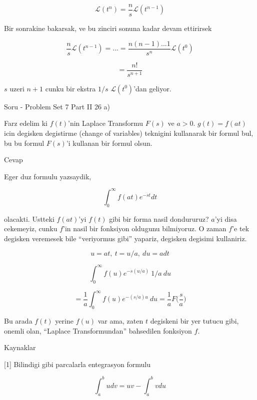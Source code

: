 \documentclass[12pt,fleqn]{article}\usepackage{../common}
\begin{document}
\[ \mathcal{L} (t^n) = \frac{n}{s} \mathcal{L} (t^{n-1}) 
 \]

Bir sonrakine bakarsak, ve bu zinciri sonuna kadar devam ettirirsek

\[ \frac{n}{s} \mathcal{L} (t^{n-1}) = ... = 
\frac{n(n-1)...1 }{s^n}\mathcal{L}(t^0)
 \]

\[ = \frac{n!}{s^{n+1}} \]

$s$ uzeri $n+1$ cunku bir ekstra $1/s$ $\mathcal{L} (t^0)$'dan geliyor. 

Soru - Problem Set 7 Part II 26 a) 

Farz edelim ki $f(t)$'nin Laplace Transformu $F(s)$ ve $a > 0$. $g(t) =
f(at)$ icin
degisken degistirme (change of variables) teknigini kullanarak bir formul
bul, bu bu formul $F(s)$'i kullanan bir formul olsun. 

Cevap 

Eger duz formulu yazsaydik, 

\[ \int _{ 0}^{\infty} f(at) e^{ -st} dt \]

olacakti. Ustteki $f(at)$'yi $f(t)$ gibi bir forma nasil dondururuz? $a$'yi
disa cekemeyiz, cunku $f$'in nasil bir fonksiyon oldugunu bilmiyoruz. O
zaman $f$'e tek degisken veremesek bile ``veriyormus gibi'' yapariz,
degisken degisimi kullaniriz. 

\[ u=at, \ t = u/a, \ du=adt \]

\[ \int _{ 0}^{\infty} f(u) e^{ -s(u/a)} \ 1/a \ du \]

\[ = \frac{ 1}{a}\int _{ 0}^{\infty} f(u) e^{ -(s/a)u} \ du  = 
\frac{ 1}{a}F \bigg(\frac{ s}{a} \bigg)
\]

Bu arada $f(t)$ yerine $f(u)$ var ama, zaten $t$ degiskeni bir yer tutucu
gibi, onemli olan, ``Laplace Transformundan'' bahsedilen fonksiyon $f$. 


Kaynaklar

[1] Bilindigi gibi parcalarla entegrasyon formulu

\[ \int_a^b u dv = 
uv - \int_a^b v du
 \]
\end{document}
